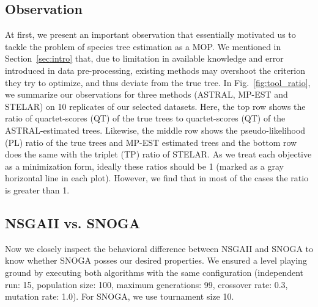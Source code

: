 \subsection{Observation}
\label{subsec:observation}
At first, we present an important observation that essentially motivated us to tackle the problem of species tree estimation as a MOP. We mentioned in Section~\ref{sec:intro} that, due to limitation in available knowledge and error introduced in data pre-processing, existing methods may overshoot the criterion they try to optimize, and thus deviate from the true tree. In Fig.~\ref{fig:tool_ratio}, we summarize our observations for three methods (ASTRAL, MP-EST and STELAR) on 10 replicates of our selected datasets. Here, the top row shows the ratio of quartet-scores (QT) of the true trees to quartet-scores (QT) of the ASTRAL-estimated trees. Likewise, the middle row shows the pseudo-likelihood (PL) ratio of the true trees and MP-EST estimated trees and the bottom row does the same with the triplet (TP) ratio of STELAR. As we treat each objective as a minimization form, ideally these ratios should be 1 (marked as a gray horizontal line in each plot). However, we find that in most of the cases the ratio is greater than 1. %


\subsection{NSGAII vs. SNOGA}
Now we closely inspect the behavioral difference between NSGAII and SNOGA to know whether SNOGA posses our desired properties. We ensured a level playing ground by executing both algorithms with the same configuration (independent run: 15, population size: 100, maximum generations: 99, crossover rate: 0.3, mutation rate: 1.0). For SNOGA, we use tournament size 10.

